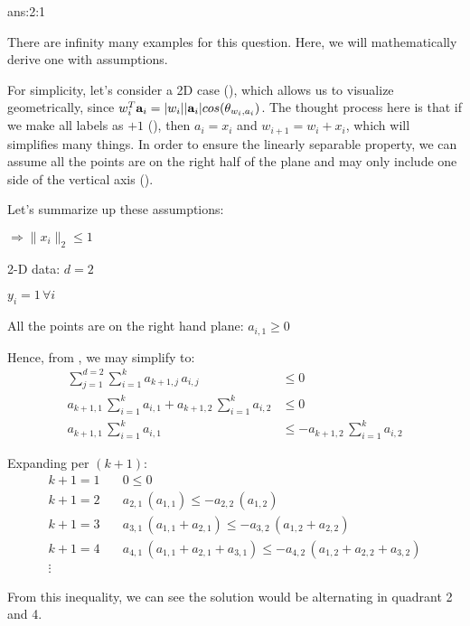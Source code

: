 \documentclass{tron}
\begin{document}
\begin{answer}{ans:2:1}
	\begin{alert}
		There are infinity many examples for this question. Here, we will mathematically derive one with assumptions.	
	\end{alert}

	For simplicity, let's consider a 2D case (), which allows us to visualize geometrically, since $w_i^T \mathbf{a}_i = |w_i||\mathbf{a}_i| cos(\theta_{w_i,a_i})$. The thought process here is that if we make all labels as $+1$ (), then $a_i = x_i$ and $w_{i+1} = w_i + x_i$, which will simplifies many things. In order to ensure the linearly separable property, we can assume all the points are on the right half of the plane and may only include one side of the vertical axis (). 

	Let's summarize up these assumptions:
	\begin{assumption-list}
		\item {} $\Rightarrow \|x_i\|_2 \leq 1$	 \label{a1:l2}
		\item 2-D data: $d = 2$ \label{a1:2d}
		\item $y_i = 1 \, \forall i$ \label{a1:label}
		\item All the points are on the right hand plane: $a_{i,1} \geq 0$ \label{a1:rhd}
	\end{assumption-list}

	Hence, from , we may simplify  to:
	\begin{align}
		\sum_{j=1}^{d=2}\sum_{i=1}^{k}{a_{k+1,j}}\,{{a_{i,j}}} & \leq 0 \\
		a_{k+1,1}\,\sum_{i=1}^{k}{{a_{i,1}}} + a_{k+1,2}\,\sum_{i=1}^{k}{{a_{i,2}}} & \leq 0 \\
		a_{k+1,1}\,\sum_{i=1}^{k}{{a_{i,1}}} & \leq -a_{k+1,2}\,\sum_{i=1}^{k}{{a_{i,2}}}
	\end{align}

	Expanding per $(k+1)$:
	\begin{align}
		k+1 = 1	\quad & 0  \leq 0\\
		k+1 = 2	\quad & a_{2,1}\,(a_{1,1})  \leq -a_{2,2}\,(a_{1,2})\\
		k+1 = 3	\quad & a_{3,1}\,(a_{1,1} + a_{2,1})  \leq -a_{3,2}\,(a_{1,2} + a_{2,2})\\
		k+1 = 4	\quad & a_{4,1}\,(a_{1,1} + a_{2,1} + a_{3,1})  \leq -a_{4,2}\,(a_{1,2} + a_{2,2} + a_{3,2})\\
		\vdots
	\end{align}
	
	From this inequality, we can see the solution would be alternating in quadrant 2 and 4. 
	

\end{answer}
\end{document}
